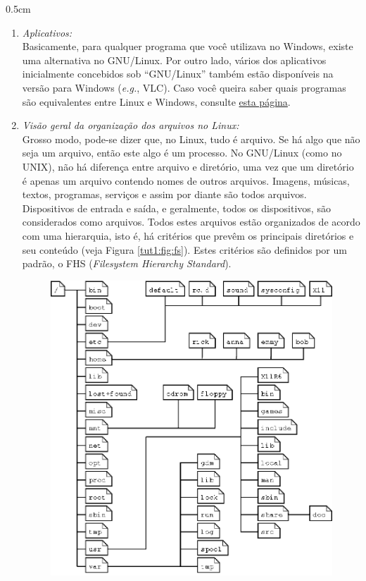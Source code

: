 \begin{refsection}
\begin {myindentpar}{0.5cm}
\begin{enumerate}[\itshape i.]
 \item \textit{Aplicativos:}\\
Basicamente, para qualquer programa que você utilizava no Windows, existe uma alternativa no GNU/Linux. Por outro lado, vários dos aplicativos inicialmente concebidos sob ``GNU/Linux'' também estão disponíveis na versão para Windows (\textit{e.g.}, VLC). Caso você queira saber quais programas são equivalentes entre Linux e Windows, consulte \href{http://wiki.linuxquestions.org/wiki/Linux_software_equivalent_to_Windows_software}{esta página}.
%
  \item \textit{Visão geral da organização dos arquivos no Linux:}\\
	Grosso modo, pode-se dizer que, no Linux, tudo é arquivo. Se há algo que não seja um arquivo, então este algo é um processo. No GNU/Linux (como no UNIX), não há diferença entre arquivo e diretório, uma vez que um diretório é apenas um arquivo contendo nomes de outros arquivos. Imagens, músicas, textos, programas, serviços e assim por diante são todos arquivos. Dispositivos de entrada e saída, e geralmente, todos os dispositivos, são considerados como arquivos. Todos estes arquivos estão organizados de acordo com uma hierarquia, isto é, há critérios que prevêm os principais diretórios e seu conteúdo (veja Figura \ref{tut1:fig:fs}). Estes critérios são definidos por um padrão, o FHS (\textit{Filesystem Hierarchy Standard}).\\
  \begin{figure}[H]
      {\includegraphics[scale=1]{figures/tut1/fs_layout.eps}}

\end{figure}
\end{enumerate}
\end{myindentpar}
\end{refsection}
